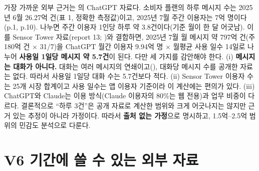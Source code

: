 \documentclass[11pt]{article}
\begin{document}
가장 가까운 외부 근거는 \textcite{chatterji-2025-how-people-use-chatgpt}의 ChatGPT 자료다. 소비자 플랜의 하루 메시지 수는 2025년 6월 26.27억 건(표 1, 정확한 측정값)이고, 2025년 7월 주간 이용자는 7억 명이다(p.1, p.10). 나누면 주간 이용자 1인당 하루 약 3.8건이다(기준 월이 한 달 어긋남). 이를 Sensor Tower 자료(report 13; \cite{sensortower-2026-state-of-ai})와 결합하면, 2025년 7월 월 메시지 약 797억 건(주 180억 건 $\times$ 31/7)을 ChatGPT 월간 이용자 9.94억 명 $\times$ 월평균 사용 일수 14일로 나누어 \textbf{사용일 1일당 메시지 약 5.7건}이 된다. 다만 세 가지를 감안해야 한다. (i) \textbf{메시지는 대화가 아니다.} 대화는 여러 메시지의 연쇄이고(\cite[p.6]{chatterji-2025-how-people-use-chatgpt}), 대화당 메시지 수를 공개한 자료는 없다. 따라서 사용일 1일당 대화 수는 5.7건보다 적다. (ii) Sensor Tower 이용자 수는 25개 시장 합계이고 사용 일수는 앱 이용자 기준이라 이 계산에는 편의가 있다. (iii) ChatGPT와 Claude는 이용 방식(Claude 이용자의 80\%는 웹 전용)과 업무 비중이 다르다. 결론적으로 ``하루 3건''은 공개 자료로 계산한 범위와 크게 어긋나지는 않지만 근거 있는 추정이 아니라 가정이다. 따라서 \textbf{출처 없는 가정}으로 명시하고, 1.5억--2.5억 범위의 민감도 분석으로 다룬다.

\section{V6 기간에 쓸 수 있는 외부 자료}
\end{document}
